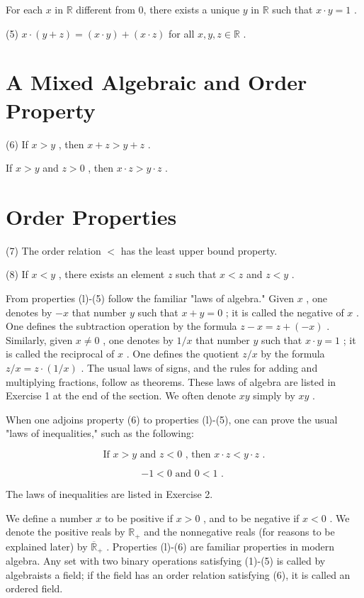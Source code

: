 \documentclass[10pt]{article}
\begin{document}
For each \(x\) in \(\mathbb{R}\) different from 0, there exists a unique \(y\) in \(\mathbb{R}\) such that \(x \cdot  y = 1\) .

(5) \(x \cdot  \left( {y + z}\right)  = \left( {x \cdot  y}\right)  + \left( {x \cdot  z}\right)\) for all \(x,y,z \in  \mathbb{R}\) .

\section*{A Mixed Algebraic and Order Property}

(6) If \(x > y\) , then \(x + z > y + z\) .

If \(x > y\) and \(z > 0\) , then \(x \cdot  z > y \cdot  z\) .

\section*{Order Properties}

(7) The order relation \(<\) has the least upper bound property.

(8) If \(x < y\) , there exists an element \(z\) such that \(x < z\) and \(z < y\) .

From properties (l)-(5) follow the familiar "laws of algebra." Given \(x\) , one denotes by \(- x\) that number \(y\) such that \(x + y = 0\) ; it is called the negative of \(x\) . One defines the subtraction operation by the formula \(z - x = z + \left( {-x}\right)\) . Similarly, given \(x \neq  0\) , one denotes by \(1/x\) that number \(y\) such that \(x \cdot  y = 1\) ; it is called the reciprocal of \(x\) . One defines the quotient \(z/x\) by the formula \(z/x = z \cdot  \left( {1/x}\right)\) . The usual laws of signs, and the rules for adding and multiplying fractions, follow as theorems. These laws of algebra are listed in Exercise 1 at the end of the section. We often denote \({xy}\) simply by \({xy}\) .

When one adjoins property (6) to properties (l)-(5), one can prove the usual "laws of inequalities," such as the following:

\[
\text{ If }x > y\text{ and }z < 0\text{ , then }x \cdot  z < y \cdot  z\text{ . }
\]

\[
- 1 < 0\text{ and }0 < 1\text{ . }
\]

The laws of inequalities are listed in Exercise 2.

We define a number \(x\) to be positive if \(x > 0\) , and to be negative if \(x < 0\) . We denote the positive reals by \({\mathbb{R}}_{ + }\) and the nonnegative reals (for reasons to be explained later) by \({\overline{\mathbb{R}}}_{ + }\) . Properties (l)-(6) are familiar properties in modern algebra. Any set with two binary operations satisfying (1)-(5) is called by algebraists a field; if the field has an order relation satisfying (6), it is called an ordered field.
\end{document}
